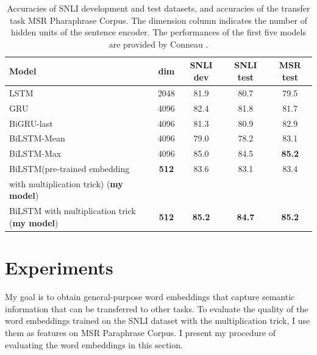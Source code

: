 \documentclass[10pt,twocolumn,letterpaper]{article}
\begin{document}
\begin{table}
\centering
\begin{center}
\begin{tabular}{|l|c|c|c|c|}\hline
Model		& dim	& SNLI dev	& SNLI test	& MSR test \\\hline
LSTM		& 2048	& 81.9	& 80.7	& 79.5 \\\hline
GRU			& 4096	& 82.4	& 81.8	& 81.7 \\\hline
BiGRU-last	& 4096	& 81.3	& 80.9	& 82.9 \\\hline
BiLSTM-Mean	& 4096	& 79.0	& 78.2	& 83.1 \\\hline
BiLSTM-Max	& 4096	& 85.0	& 84.5	& \textbf{85.2} \\\hline
BiLSTM(pre-trained embedding	& \textbf{512}	& 83.6	& 83.1	& 83.4 \\
with multiplication trick) (\textbf{my model})&&&&\\\hline
BiLSTM with multiplication trick (\textbf{my model})	& \textbf{512}	& \textbf{85.2}	& \textbf{84.7}	& \textbf{85.2} \\\hline
\end{tabular}
\end{center}
\caption{Accuracies of SNLI development and test datasets, and accuracies of the transfer task MSR Pharaphrase Corpus. The dimension column indicates the number of hidden units of the sentence encoder. The performances of the first five models are provided by Conneau \etal \cite{conneau2017supervised}.}
\label{tab:acc}
\end{table}

\section{Experiments}
My goal is to obtain general-purpose word embeddings that capture semantic information that can be transferred to other tasks. To evaluate the quality of the word embeddings trained on the SNLI dataset with the multiplication trick, I use them as features on MSR Paraphrase Corpus. I present my procedure of evaluating the word embeddings in this section.
\end{document}
